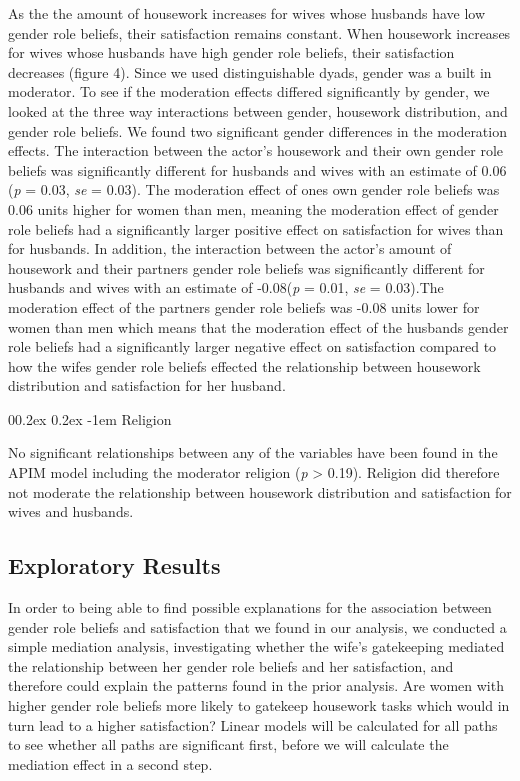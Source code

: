 \documentclass[
  man,floatsintext]{apa6}
\makeatletter
\let\oldparagraph\paragraph
\renewcommand{\paragraph}[1]{\oldparagraph{#1}\mbox{}}
\renewcommand{\paragraph}{\@startsection{paragraph}{4}{\parindent}%
  {0\baselineskip \@plus 0.2ex \@minus 0.2ex}%
  {-1em}%
  {\normalfont\normalsize\bfseries\itshape\typesectitle}}
\makeatother
\begin{document}
As the the amount of housework increases for wives whose husbands have low gender role beliefs, their satisfaction remains constant. When housework increases for wives whose husbands have high gender role beliefs, their satisfaction decreases (figure 4).
Since we used distinguishable dyads, gender was a built in moderator. To see if the moderation effects differed significantly by gender, we looked at the three way interactions between gender, housework distribution, and gender role beliefs. We found two significant gender differences in the moderation effects. The interaction between the actor's housework and their own gender role beliefs was significantly different for husbands and wives with an estimate of 0.06 (\emph{p} = 0.03, \emph{se} = 0.03). The moderation effect of ones own gender role beliefs was 0.06 units higher for women than men, meaning the moderation effect of gender role beliefs had a significantly larger positive effect on satisfaction for wives than for husbands.
In addition, the interaction between the actor's amount of housework and their partners gender role beliefs was significantly different for husbands and wives with an estimate of -0.08(\emph{p} = 0.01, \emph{se} = 0.03).The moderation effect of the partners gender role beliefs was -0.08 units lower for women than men which means that the moderation effect of the husbands gender role beliefs had a significantly larger negative effect on satisfaction compared to how the wifes gender role beliefs effected the relationship between housework distribution and satisfaction for her husband.

\hypertarget{religion}{%
\paragraph{Religion}\label{religion}}

No significant relationships between any of the variables have been found in the APIM model including the moderator religion (\emph{p} \textgreater{} 0.19). Religion did therefore not moderate the relationship between housework distribution and satisfaction for wives and husbands.

\hypertarget{exploratory-results}{%
\subsection{Exploratory Results}\label{exploratory-results}}

In order to being able to find possible explanations for the association between gender role beliefs and satisfaction that we found in our analysis, we conducted a simple mediation analysis, investigating whether the wife's gatekeeping mediated the relationship between her gender role beliefs and her satisfaction, and therefore could explain the patterns found in the prior analysis. Are women with higher gender role beliefs more likely to gatekeep housework tasks which would in turn lead to a higher satisfaction?
Linear models will be calculated for all paths to see whether all paths are significant first, before we will calculate the mediation effect in a second step.
\end{document}

